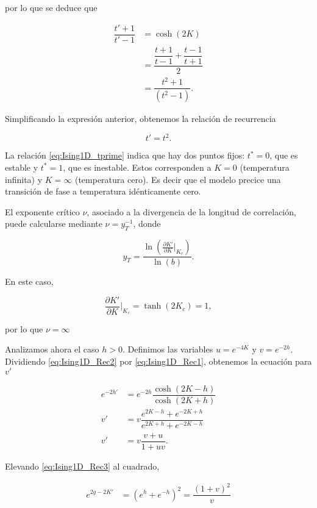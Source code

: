 \documentclass[10pt]{article}
\begin{document}
por lo que se deduce que 

\begin{align}
 \dfrac{t'+1}{t'-1}  &= \cosh(2K) \nonumber \\
 &= \dfrac{\dfrac{t+1}{t-1} + \dfrac{t-1}{t+1}}{2} \nonumber \\
 &= \dfrac{t^2+1}{(t^2-1)}.
\end{align}

Simplificando la expresi\'on anterior, obtenemos la relaci\'on de recurrencia

\begin{equation} \label{eq:Ising1D_tprime}
t' = t^2.
\end{equation}

La relaci\'on \ref{eq:Ising1D_tprime} indica que hay dos puntos fijos: $t^*=0$, que es estable y $t^*=1$, que es inestable. Estos corresponden a $K=0$ (temperatura infinita) y $K=\infty$ (temperatura cero). Es decir que el modelo precice una transici\'on de fase a temperatura id\'enticamente cero.

El exponente cr\'itico $\nu$, asociado a la divergencia de la longitud de correlaci\'on, puede calcularse mediante $\nu = y_T^{-1}$, donde 

\begin{equation}
y_T = \dfrac{\ln\left(\frac{\partial K'}{\partial K}\Bigr|_{K_c}\right)}{\ln (b)}.
\end{equation}

En este caso,

\begin{equation}
\frac{\partial K'}{\partial K}\Bigr|_{K_c} = \tanh(2K_c) = 1,
\end{equation}

por lo que $\nu = \infty$

Analizamos ahora el caso $h>0$. Definimos las variables $u=e^{-4K}$ y $v=e^{-2h}$. Dividiendo  \ref{eq:Ising1D_Rec2} por  \ref{eq:Ising1D_Rec1}, obtenemos la ecuaci\'on para $v'$

\begin{align}
e^{-2h'} &= e^{-2h} \dfrac{\cosh(2K-h)}{\cosh(2K+h)} \nonumber \\
v' &= v \dfrac{e^{2K-h} + e^{-2K+h}}{e^{2K+h} + e^{-2K-h}} \nonumber \\
v' &= v \dfrac{v+u}{1+uv}.
\end{align}

Elevando \ref{eq:Ising1D_Rec3} al cuadrado,

\begin{align}\label{eq:Ising1D_Rec4}
e^{2g-2K'} &= (e^h + e^{-h})^2 = \dfrac{(1+v)^2}{v} 
\end{align}
\end{document}
